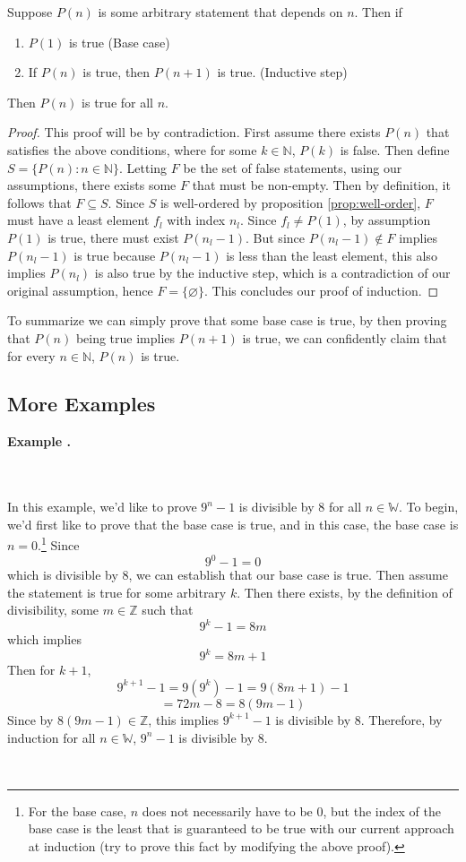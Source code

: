 \documentclass[11pt]{article}
\numberwithin{lemma}{section}
\numberwithin{equation}{section}
\numberwithin{define}{section}
\numberwithin{prop}{section}
\numberwithin{figure}{section}
\numberwithin{theorem}{section}
\newcounter{ex}[section]
\newenvironment{ex}[0]{

	\refstepcounter{ex}
	\begin{large}
    \textbf{Example \theex .}
    \end{large}\\\\
    }
    {
    \\
    }
\numberwithin{ex}{section}
\def\nat{\mathbb{N}}
\def\integ{\mathbb{Z}}
\begin{document}
\begin{theorem}[Induction]
	Suppose $P(n)$ is some arbitrary statement that depends on $n$. Then if
	\begin{enumerate}
		\item $P(1)$ is true (Base case)
		\item If $P(n)$ is true, then $P(n+1)$ is true. (Inductive step)
	\end{enumerate}
	Then $P(n)$ is true for all $n$.
\end{theorem}
\begin{proof}
	This proof will be by contradiction. First assume there exists $P(n)$ that satisfies the above conditions, where for some $k\in\nat$, $P(k)$ is false. 
	Then define $S=\{P(n):n\in\nat\}$. Letting $F$ be the set of false statements, using our assumptions, there exists some $F$ that must be non-empty. 
	Then by definition, it follows that $F\subseteq S$. Since $S$ is well-ordered by proposition \eqref{prop:well-order}, $F$ must have a least element $f_l$ with index $n_l$. 
	Since $f_l\neq P(1)$, by assumption $P(1)$ is true, there must exist $P(n_l-1)$. 
	But since $P(n_l-1)\notin F$ implies $P(n_l-1)$ is true because $P(n_l-1)$ is less than the least element, this also implies $P(n_l)$ is also true by the inductive step, which is a contradiction of our original assumption, hence $F=\{\varnothing\}$. 
	This concludes our proof of induction.
\end{proof}

To summarize we can simply prove that some base case is true, by then proving that $P(n)$ being true implies $P(n+1)$ is true, we can confidently claim that for every $n\in\nat$, $P(n)$ is true.
\subsection{More Examples}
\begin{ex}
	In this example, we'd like to prove $9^n-1$ is divisible by $8$ for all $n\in\mathbb{W}$. 
	To begin, we'd first like to prove that the base case is true, and in this case, the base case is $n=0$.\footnote{For the base case, $n$ does not necessarily have to be 0, but the index of the base case is the least that is guaranteed to be true with our current approach at induction (try to prove this fact by modifying the above proof).} Since
	$$9^0-1=0$$
	which is divisible by 8, we can establish that our base case is true. Then assume the statement is true for some arbitrary $k$. Then there exists, by the definition of divisibility, some $m\in\integ$ such that
	$$9^k-1=8m$$
	which implies
	$$9^k=8m+1$$
	Then for $k+1$,
	$$9^{k+1}-1=9(9^k)-1=9(8m+1)-1$$
	$$=72m-8=8(9m-1)$$
	Since by $8(9m-1)\in\integ$, this implies $9^{k+1}-1$ is divisible by 8. Therefore, by induction for all $n\in\mathbb{W}$, $9^n-1$ is divisible by 8.
\end{ex}
\end{document}
